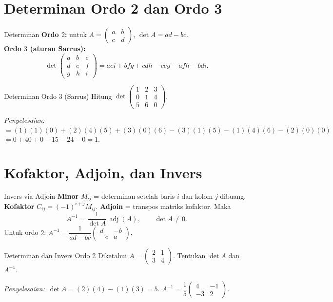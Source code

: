 \documentclass[11pt,a4paper]{report}
\theoremstyle{gaya}
\newcommand{\jawab}{\par\smallskip\noindent\textit{\textcolor{oranye}{Penyelesaian:}}\ }
\begin{document}
\section{Determinan Ordo 2 dan Ordo 3}
\begin{konsep}{Determinan}
\textbf{Ordo $2$:} untuk $A=\begin{pmatrix}a&b\\c&d\end{pmatrix}$, $\det A=ad-bc$.\\[4pt]
\textbf{Ordo $3$ (aturan Sarrus):}
\[
\det\begin{pmatrix}a&b&c\\d&e&f\\g&h&i\end{pmatrix}
=aei+bfg+cdh-ceg-afh-bdi.
\]
\end{konsep}

\begin{contoh}{Determinan Ordo 3 (Sarrus)}
Hitung $\det\begin{pmatrix}1&2&3\\0&1&4\\5&6&0\end{pmatrix}$.

\jawab $=(1)(1)(0)+(2)(4)(5)+(3)(0)(6)-(3)(1)(5)-(1)(4)(6)-(2)(0)(0)$
$=0+40+0-15-24-0=1.$
\end{contoh}

\section{Kofaktor, Adjoin, dan Invers}
\begin{konsep}{Invers via Adjoin}
\textbf{Minor} $M_{ij}$ = determinan setelah baris $i$ dan kolom $j$ dibuang. \textbf{Kofaktor} $C_{ij}=(-1)^{i+j}M_{ij}$. \textbf{Adjoin} = transpos matriks kofaktor. Maka
\[
A^{-1}=\frac{1}{\det A}\,\operatorname{adj}(A),\qquad \det A\neq0.
\]
Untuk ordo $2$: $A^{-1}=\dfrac{1}{ad-bc}\begin{pmatrix}d&-b\\-c&a\end{pmatrix}$.
\end{konsep}

\begin{contoh}{Determinan dan Invers Ordo 2}
Diketahui $A = \begin{pmatrix} 2 & 1\\ 3 & 4 \end{pmatrix}$. Tentukan $\det A$ dan $A^{-1}$.

\jawab $\det A = (2)(4)-(1)(3) = 5$.
$A^{-1} = \dfrac{1}{5}\begin{pmatrix} 4 & -1\\ -3 & 2 \end{pmatrix}.$
\end{contoh}
\end{document}
